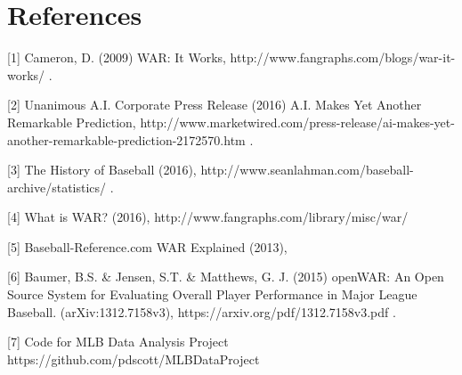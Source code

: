 \documentclass{article} %
\begin{document}
\section*{References}
\small{
[1] Cameron, D. (2009) WAR: It Works, http://www.fangraphs.com/blogs/war-it-works/ . 

[2] Unanimous A.I. Corporate Press Release (2016) A.I. Makes Yet Another Remarkable Prediction, http://www.marketwired.com/press-release/ai-makes-yet-another-remarkable-prediction-2172570.htm . 

[3] The History of Baseball (2016), http://www.seanlahman.com/baseball-archive/statistics/ . 

[4] What is WAR? (2016), http://www.fangraphs.com/library/misc/war/ 

[5] Baseball-Reference.com WAR Explained (2013), %

[6] Baumer, B.S. \& Jensen, S.T. \& Matthews, G. J. (2015) openWAR: An Open Source System for Evaluating Overall Player Performance in Major League Baseball. (arXiv:1312.7158v3), https://arxiv.org/pdf/1312.7158v3.pdf . 

[7] Code for MLB Data Analysis Project https://github.com/pdscott/MLBDataProject 
}
\end{document}
